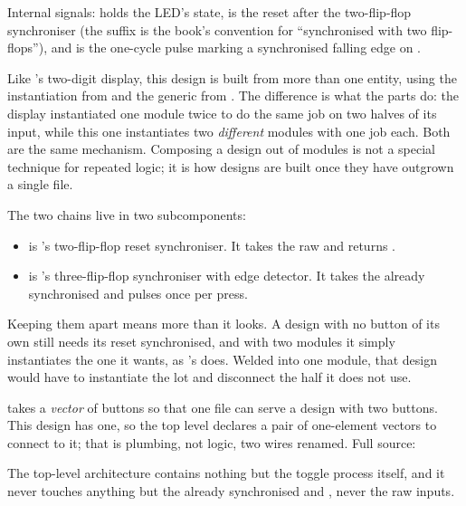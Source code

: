 Internal signals:  holds the LED's state,  is the reset after the
two-flip-flop synchroniser (the suffix  is the book's convention for ``synchronised with
two flip-flops''), and  is the one-cycle pulse marking a synchronised falling
edge on .

Like 's two-digit display, this design is built from more than one entity, using the
instantiation from  and the generic from . The
difference is what the parts do: the display instantiated one module twice to do the same job on two
halves of its input, while this one instantiates two \emph{different} modules with one job each.
Both are the same mechanism. Composing a design out of modules is not a special technique for
repeated logic; it is how designs are built once they have outgrown a single file.

The two chains live in two subcomponents:
\begin{itemize}
  \item {} is 's two-flip-flop reset synchroniser. It takes
    the raw  and returns .
  \item {} is 's three-flip-flop synchroniser with edge
    detector. It takes the already synchronised  and pulses
     once per press.
\end{itemize}

Keeping them apart means more than it looks. A design with no button of its own still needs its
reset synchronised, and with two modules it simply instantiates the one it wants, as
's  does. Welded into one module, that design would have to
instantiate the lot and disconnect the half it does not use.

 takes a \emph{vector} of buttons so that one file can serve a design with two
buttons. This design has one, so the top level declares a pair of one-element vectors to connect to
it; that is plumbing, not logic, two wires renamed. Full source:


The top-level architecture contains nothing but the toggle process itself, and it never touches
anything but the already synchronised  and , never the raw
inputs.

